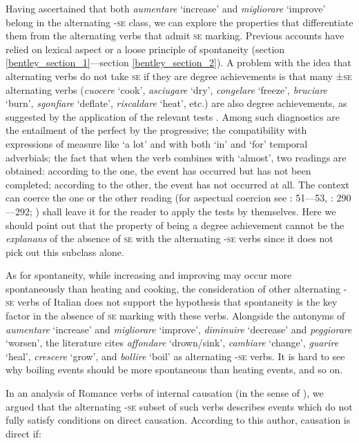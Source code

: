 \documentclass[output=paper,colorlinks,citecolor=brown
]{langscibook}
\begin{document}
Having ascertained that both \textit{aumentare} ‘increase’ and \textit{migliorare} ‘improve’ belong in the alternating -\textsc{se} class, we can explore the properties that differentiate them from the alternating verbs that admit \textsc{se} marking. Previous accounts have relied on lexical aspect or a loose principle of spontaneity (section \ref{bentley_section_1}—section \ref{bentley_section_2}). A problem with the idea that alternating verbs do not take \textsc{se} if they are degree achievements is that many ±\textsc{se} alternating verbs (\textit{cuocere} ‘cook’, \textit{asciugare} ‘dry’, \textit{congelare} ‘freeze’, \textit{bruciare} ‘burn’, \textit{sgonfiare} ‘deflate’, \textit{riscaldare} ‘heat’, etc.) are also degree achievements, as suggested by the application of the relevant tests \citep{dowty1979word,bertinetto1995attempt,hay1999scalar}. Among such diagnostics are the entailment of the perfect by the progressive; the compatibility with expressions of measure like ‘a lot’ and with both ‘in’ and ‘for’ temporal adverbials; the fact that when the verb combines with ‘almost’, two readings are obtained: according to the one, the event has occurred but has not been completed; according to the other, the event has not occurred at all. The context can coerce the one or the other reading (for aspectual coercion see \cite{jackendoff1997architecture}: 51—53, \cite{jackendoff2002foundations}: 290—292; \cite{pustejovsky1991syntax}) shall leave it for the reader to apply the tests by themselves. Here we should point out that the property of being a degree achievement cannot be the \textit{explanans} of the absence of \textsc{se} with the alternating -\textsc{se} verbs since it does not pick out this subclass alone. 

As for spontaneity, while increasing and improving may occur more spontaneously than heating and cooking, the consideration of other alternating -\textsc{se} verbs of Italian does not support the hypothesis that spontaneity is the key factor in the absence of \textsc{se} marking with these verbs. Alongside the antonyms of \textit{aumentare} ‘increase’ and \textit{migliorare} ‘improve’, \textit{diminuire} ‘decrease’ and \textit{peggiorare} ‘worsen’, the literature cites \textit{affondare} ‘drown/sink’, \textit{cambiare} ‘change’, \textit{guarire} ‘heal’, \textit{crescere} ‘grow’, and \textit{bollire} ‘boil’ as alternating -\textsc{se} verbs. It is hard to see why boiling events should be more spontaneous than heating events, and so on.

In an analysis of Romance verbs of internal causation (in the sense of \cite{levin1995unaccusativity}), we argued that the alternating -\textsc{se} subset of such verbs describes events which do not fully satisfy \citet[4—5]{wolff2003direct} conditions on direct causation. According to this author, causation is direct if:
\end{document}
